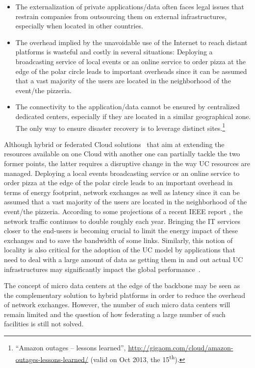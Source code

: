 \begin{itemize}
\item The externalization of private applications/data often faces legal issues
that restrain companies from outsourcing them on external infrastructures,
especially when located in other countries. 
\item The overhead implied by the unavoidable use of the Internet to reach
distant platforms is wasteful and costly in several situations: Deploying a
broadcasting service of local events or an online service to order pizza at the
edge of the polar circle leads to important overheads since it can be assumed
that a vast majority of the users are located in the neighborhood of the
event/the pizzeria.  
\item The connectivity to the application/data cannot be ensured by centralized
dedicated centers, especially if they are located in a similar geographical
zone. The only way to ensure disaster recovery is to leverage distinct
sites.\footnote{“Amazon outages – lessons learned”,
\href{http://gigaom.com/cloud/amazon-outages-lessons-learned/}{http://gigaom.com/cloud/amazon-outages-lessons-learned/}
(valid on Oct 2013, the 15\textsuperscript{th}).} 
\end{itemize}

Although hybrid or federated Cloud solutions~\cite{armbrust:2010} that aim at extending
the resources available on one Cloud  with another one
can partially tackle the two former points, the latter requires a disruptive change in
the way UC resources are managed. Deploying a local events broadcasting service or an
online service to order pizza at the edge of the polar circle leads to an important overhead
in terms of energy footprint, network exchanges as well as latency since it can be assumed
that a vast majority of the users are located in the neighborhood of the event/the
pizzeria.  According to some projections of a recent IEEE report
\cite{ieeenetreport:2012}, the network traffic continues to double roughly each
year. Bringing the IT services closer to the end-users is becoming crucial to limit
the energy impact of these exchanges and to save the bandwidth of some links. Similarly,
this notion of locality is also critical for the adoption of the UC model by applications
that need to deal with a large amount of data as getting them in and out actual UC
infrastructures may significantly impact the global performance~\cite{Fos11}. 

The concept of micro data centers at the edge of the backbone
\cite{greenberg:sigcomm09} may be seen as the complementary solution to hybrid
platforms in order to reduce the overhead of network exchanges.  However, the
number of such micro data centers will remain limited and the question of how
federating a large number of such facilities is still not solved.  

